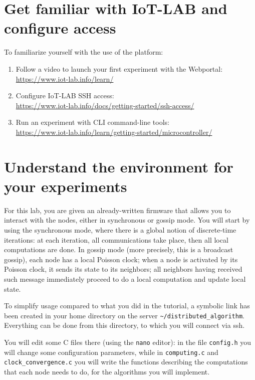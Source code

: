 \documentclass[oneside]{article}
\begin{document}
\newpage

\section{Get familiar with IoT-LAB and configure access}

To familiarize yourself with the use of the platform:
\begin{enumerate}
   \item Follow a video to launch your first experiment with the Webportal: \\
   \url{https://www.iot-lab.info/learn/}
   \item Configure IoT-LAB SSH access: \\
   \url{https://www.iot-lab.info/docs/getting-started/ssh-access/}
   \item Run an experiment with CLI command-line tools: \\
   \url{https://www.iot-lab.info/learn/getting-started/microcontroller/}
\end{enumerate}

\section{Understand the environment for your experiments}

For this lab, you are given
an already-written firmware that allows you to interact with the nodes,
either in synchronous or gossip mode.
You will start by using the synchronous mode,
where there is a global notion of discrete-time iterations: at each iteration,
all communications take place, then all local computations are done.
In gossip mode (more precisely, this is a broadcast gossip), each node has a local Poisson clock; when a node is activated by its Poisson clock, it sends its state to its neighbors; all neighbors having received such message immediately proceed to do a local computation and update local state.



To simplify usage compared to what you did in the tutorial, a symbolic link has been
created in your home directory on the server \verb=~/distributed_algorithm=.
Everything can be done from this directory, to which you will connect via ssh.

You will edit some C files there (using the \verb=nano= editor): in the file \verb=config.h= you will change some configuration parameters, while in  \verb=computing.c= and \verb=clock_convergence.c= you will write the functions describing the computations that each node needs to do, for the algorithms you will implement.
\end{document}
